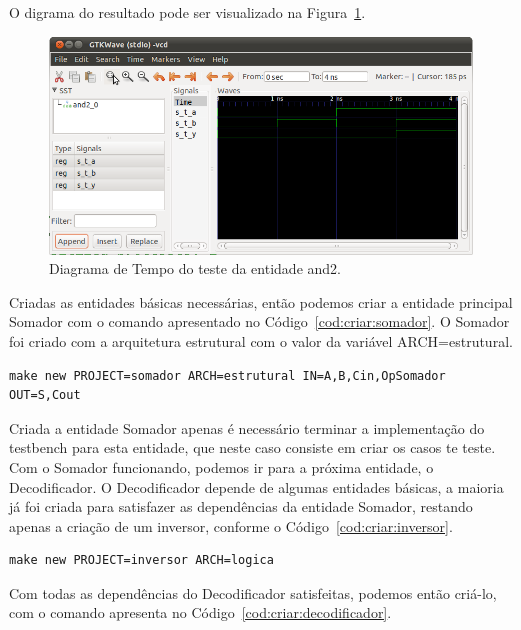 \documentclass[a4paper,10pt]{report}
\begin{document}
O digrama do resultado pode ser visualizado na Figura~\ref{fig:gtw:and2}.

\begin{figure}[H]
\centering
\includegraphics[width=1\textwidth]{figuras/gtw_and2.png}
\caption{Diagrama de Tempo do teste da entidade and2.}
\label{fig:gtw:and2}
\end{figure}

Criadas as entidades básicas necessárias, então podemos criar a entidade principal Somador com o comando apresentado no Código~\ref{cod:criar:somador}. O Somador foi criado com a arquitetura estrutural com o valor da variável ARCH=estrutural.

\lstset{numbers=left, numberstyle=\tiny, stepnumber=1, numbersep=3pt}
\begin{lstlisting}[label=cod:criar:somador,caption=Comando para a criar a entidade Somador.]
  make new PROJECT=somador ARCH=estrutural IN=A,B,Cin,OpSomador OUT=S,Cout
\end{lstlisting}

Criada a entidade Somador apenas é necessário terminar a implementação do testbench para esta entidade, que neste caso consiste em criar os casos te teste.
Com o Somador funcionando, podemos ir para a próxima entidade, o Decodificador.
O Decodificador depende de algumas entidades básicas, a maioria já foi criada para satisfazer as dependências da entidade Somador, restando apenas a criação de um inversor, conforme o Código~\ref{cod:criar:inversor}.

\lstset{numbers=left, numberstyle=\tiny, stepnumber=1, numbersep=3pt}
\begin{lstlisting}[label=cod:criar:inversor,caption=Comando para a criar a entidade Inversor.]
  make new PROJECT=inversor ARCH=logica
\end{lstlisting}

Com todas as dependências do Decodificador satisfeitas, podemos então criá-lo, com o comando apresenta no Código~\ref{cod:criar:decodificador}.
\end{document}
